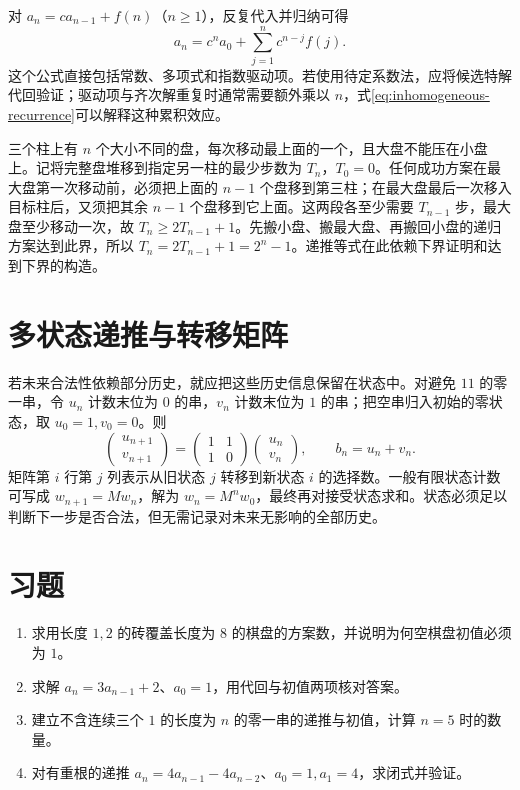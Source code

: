 \documentclass[UTF8,12pt,a4paper,fontset=fandol]{ctexbook}
\begin{document}
对 $a_n=ca_{n-1}+f(n)$（$n\ge1$），反复代入并归纳可得
\begin{equation}
  a_n=c^na_0+\sum_{j=1}^n c^{n-j}f(j).
  \label{eq:inhomogeneous-recurrence}
\end{equation}
这个公式直接包括常数、多项式和指数驱动项。若使用待定系数法，应将候选特解代回验证；驱动项与齐次解重复时通常需要额外乘以 $n$，式\eqref{eq:inhomogeneous-recurrence}可以解释这种累积效应。

\begin{example}
三个柱上有 $n$ 个大小不同的盘，每次移动最上面的一个，且大盘不能压在小盘上。记将完整盘堆移到指定另一柱的最少步数为 $T_n$，$T_0=0$。任何成功方案在最大盘第一次移动前，必须把上面的 $n-1$ 个盘移到第三柱；在最大盘最后一次移入目标柱后，又须把其余 $n-1$ 个盘移到它上面。这两段各至少需要 $T_{n-1}$ 步，最大盘至少移动一次，故 $T_n\ge2T_{n-1}+1$。先搬小盘、搬最大盘、再搬回小盘的递归方案达到此界，所以 $T_n=2T_{n-1}+1=2^n-1$。递推等式在此依赖下界证明和达到下界的构造。
\end{example}

\section{多状态递推与转移矩阵}

若未来合法性依赖部分历史，就应把这些历史信息保留在状态中。对避免 $11$ 的零一串，令 $u_n$ 计数末位为 $0$ 的串，$v_n$ 计数末位为 $1$ 的串；把空串归入初始的零状态，取 $u_0=1,v_0=0$。则
\[
 \begin{pmatrix}u_{n+1}\\v_{n+1}\end{pmatrix}
 =\begin{pmatrix}1&1\\1&0\end{pmatrix}
  \begin{pmatrix}u_n\\v_n\end{pmatrix},\qquad b_n=u_n+v_n.
\]
矩阵第 $i$ 行第 $j$ 列表示从旧状态 $j$ 转移到新状态 $i$ 的选择数。一般有限状态计数可写成 $w_{n+1}=Mw_n$，解为 $w_n=M^nw_0$，最终再对接受状态求和。状态必须足以判断下一步是否合法，但无需记录对未来无影响的全部历史。

\section{习题}
\begin{enumerate}
  \item\label{ex:recurrences-1} 求用长度 $1,2$ 的砖覆盖长度为 $8$ 的棋盘的方案数，并说明为何空棋盘初值必须为 $1$。
  \item\label{ex:recurrences-2} 求解 $a_n=3a_{n-1}+2$、$a_0=1$，用代回与初值两项核对答案。
  \item\label{ex:recurrences-3} 建立不含连续三个 $1$ 的长度为 $n$ 的零一串的递推与初值，计算 $n=5$ 时的数量。
  \item\label{ex:recurrences-4} 对有重根的递推 $a_n=4a_{n-1}-4a_{n-2}$、$a_0=1,a_1=4$，求闭式并验证。
\end{enumerate}
\end{document}
